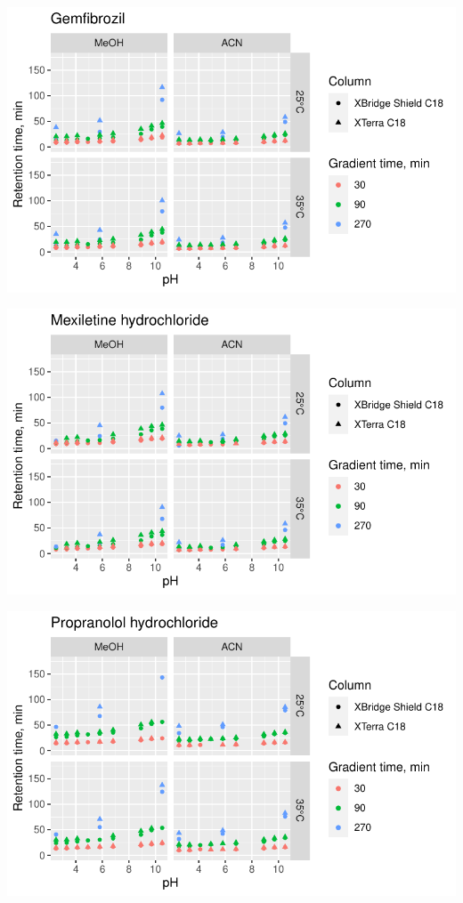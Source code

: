 \documentclass[
  letterpaper,
  DIV=11,
  numbers=noendperiod]{scrreprt}
\begin{document}
\includegraphics{index_files/figure-pdf/unnamed-chunk-4-111.pdf}

\includegraphics{index_files/figure-pdf/unnamed-chunk-4-112.pdf}

\includegraphics{index_files/figure-pdf/unnamed-chunk-4-113.pdf}
\end{document}
